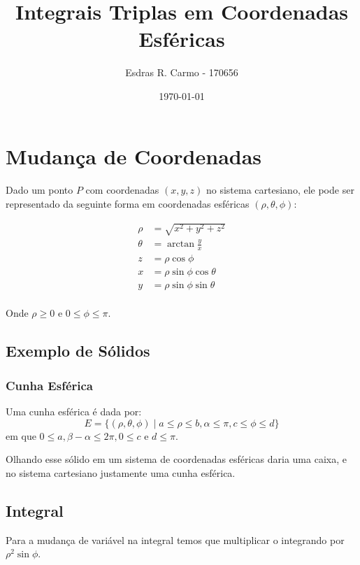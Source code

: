 \documentclass{article}
\author{Esdras R. Carmo - 170656}
\title{Integrais Triplas em Coordenadas Esféricas}
\date{\today}
\begin{document}
    \maketitle

    \section{Mudança de Coordenadas}
        \paragraph{}
        Dado um ponto $P$ com coordenadas $(x, y, z)$ no sistema cartesiano, ele pode ser representado
        da seguinte forma em coordenadas esféricas $(\rho, \theta, \phi)$:

        \begin{align*}
            \rho &= \sqrt{x^2 + y^2 + z^2}\\
            \theta &= \arctan \frac{y}{x}\\
            z &= \rho \cos \phi\\
            x &= \rho \sin \phi \cos \theta\\
            y &= \rho \sin \phi \sin \theta\\
        \end{align*}

        Onde $\rho \geq 0$ e $0 \leq \phi \leq \pi$.


        \subsection{Exemplo de Sólidos}
            \subsubsection{Cunha Esférica}
                Uma cunha esférica é dada por:
                \[
                    E = \{ (\rho, \theta, \phi) \mid a \leq \rho \leq b, \alpha \leq \pi, c \leq \phi \leq d \}
                \]
                em que $0 \leq a, \beta - \alpha \leq 2\pi, 0 \leq c$ e $d \leq \pi$.

                Olhando esse sólido em um sistema de coordenadas esféricas daria uma caixa, e no sistema cartesiano
                justamente uma cunha esférica.

        \subsection{Integral}
            Para a mudança de variável na integral temos que multiplicar o integrando por $\rho^2 \sin \phi$.
\end{document}
